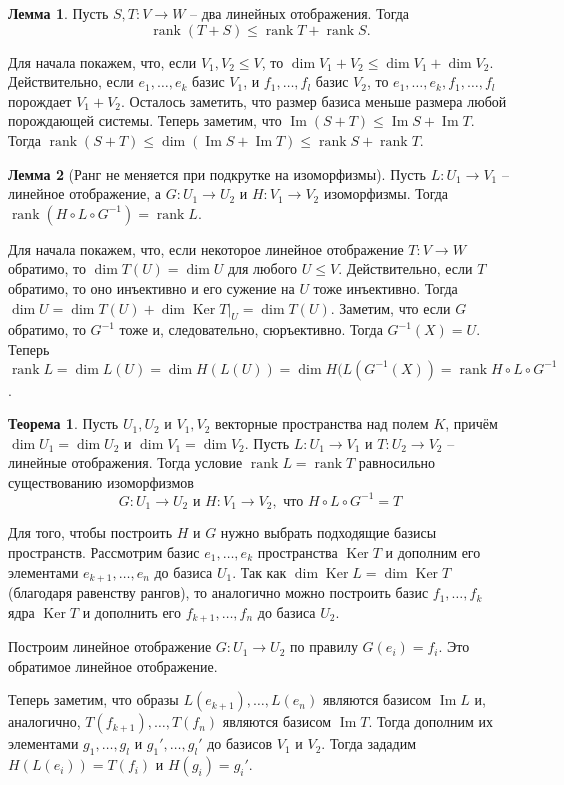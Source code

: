 \documentclass[10pt,a4paper,oneside]{book} %
\theoremstyle{definition}
\newtheorem{thm}{Теорема}
\newtheorem{lem}{Лемма}
\newcommand{\rank}{\operatorname{rank}}
\DeclareMathOperator{\Ker}{Ker}
\newcommand{\im}{\operatorname{Im}}
\def\thrm{\begin{thm}}
\def\ethrm{\end{thm}}
\def\lm{\begin{lem}}
\def\elm{\end{lem}}
\begin{document}
\lm Пусть $S, T \colon V \to W$ -- два линейных отображения. Тогда $$\rank (T + S) \leq \rank T + \rank S.$$
\elm
\proof Для начала покажем, что, если $V_1,V_2 \leq V$, то $\dim V_1 +V_2 \leq \dim V_1 + \dim V_2$. Действительно, если $e_1,\dots, e_k$ базис  $V_1$, и $f_1,\dots, f_l$ базис $V_2$, то $e_1,\dots, e_k, f_1, \dots, f_l$ порождает $V_1+V_2$. Осталось заметить, что размер базиса меньше размера любой порождающей системы.
Теперь заметим, что $\im (S+T) \leq \im S + \im T$. Тогда $\rank (S+T) \leq \dim (\im S + \im T) \leq \rank S + \rank T$.
\endproof

\lm[Ранг не меняется при подкрутке на изоморфизмы] Пусть $L \colon U_1 \to V_1$ -- линейное отображение, а $G \colon U_1 \to U_2 $ и $H \colon V_1 \to V_2$ изоморфизмы. Тогда $\rank (H \circ L \circ G^{-1}) = \rank L$.
\elm
\proof Для начала покажем, что, если некоторое линейное отображение $T\colon V \to W$ обратимо, то  $\dim T(U)= \dim U$ для любого $U \leq V$. Действительно, если $T$ обратимо, то оно инъективно и его сужение на $U$ тоже инъективно. Тогда $\dim U = \dim T(U) + \dim \Ker T|_U= \dim T(U)$.
Заметим, что если $G$ обратимо, то  $G^{-1}$ тоже и, следовательно, сюръективно. Тогда $G^{-1}(X)=U$.  Теперь $\rank L= \dim L(U)= \dim H(L(U))= \dim H(L(G^{-1}(X))= \rank H \circ L \circ G^{-1}$.
\endproof

\thrm Пусть $U_1, U_2$ и $V_1,V_2$ векторные пространства над полем $K$, причём  $\dim U_1=\dim U_2$ и $\dim V_1 =\dim V_2$. Пусть $L \colon U_1\to V_1$ и $T \colon U_2 \to V_2$ -- линейные отображения. Тогда условие $\rank L=\rank T$ равносильно существованию изоморфизмов
$$G \colon U_1 \to U_2 \text{ и }  H \colon V_1 \to V_2, \text{ что }  H \circ L \circ G^{-1}=T$$
\ethrm
\proof Для того, чтобы построить $H$ и $G$ нужно выбрать подходящие базисы пространств. Рассмотрим базис $e_1,\dots, e_k$ пространства $\Ker T$ и дополним его элементами $e_{k+1},\dots, e_n$ до базиса $U_1$. Так как $\dim \Ker L = \dim \Ker T$ (благодаря равенству рангов), то аналогично можно построить базис $f_1,\dots, f_k$ ядра $\Ker T$ и дополнить его $f_{k+1},\dots, f_n$ до базиса $U_2$.

Построим линейное отображение $G\colon U_1 \to U_2$ по правилу $G(e_i)=f_i$. Это обратимое линейное отображение.

Теперь заметим, что образы $L(e_{k+1}), \dots, L(e_n)$ являются базисом $\im L$ и, аналогично, $T(f_{k+1}), \dots, T(f_n)$  являются базисом $\im T$. Тогда дополним их элементами $g_1,\dots,g_l$ и $ g_1',\dots, g_l'$ до базисов $V_1$ и $V_2$. Тогда  зададим $H(L(e_i))=T(f_i)$ и $H(g_i)=g_i'$.
\end{document}
